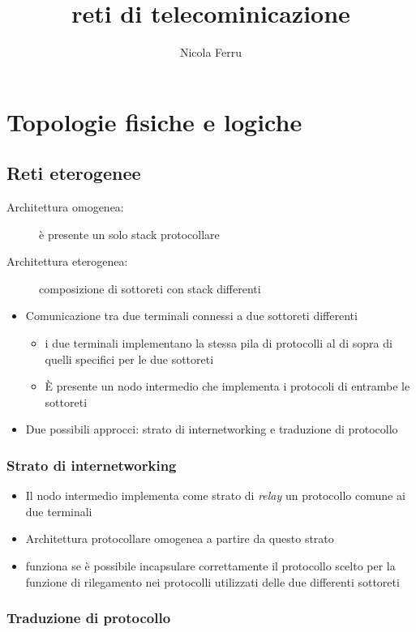 \documentclass{book}
\title{reti di telecominicazione}
\author{Nicola Ferru}
\theoremstyle{definition}
\begin{document}

\tableofcontents


\clearpage
\section{Topologie fisiche e logiche}
\label{sec:fiselogic}

\subsection{Reti eterogenee}
\label{sec:retiEterogenee}
\begin{description}
\item[Architettura omogenea:] è presente un solo stack protocollare
\item[Architettura eterogenea:] composizione di sottoreti con stack differenti
\end{description}
\begin{itemize}
\item Comunicazione tra due terminali connessi a due sottoreti differenti
  \begin{itemize}
  \item i due terminali implementano la stessa pila di protocolli al di sopra di quelli specifici per le
    due sottoreti
  \item È presente un nodo intermedio che implementa i protocoli di entrambe le sottoreti
  \end{itemize}
\item Due possibili approcci: strato di internetworking e traduzione di protocollo
\end{itemize}
\subsubsection{Strato di internetworking}
\label{sec:stratodiinter}
\begin{itemize}
\item Il nodo intermedio implementa come strato di \textit{relay} un protocollo comune ai due terminali
\item Architettura protocollare omogenea a partire da questo strato
\item funziona se è possibile incapsulare correttamente il protocollo scelto per la funzione di rilegamento
    nei protocolli utilizzati delle due differenti sottoreti
\end{itemize}

\subsubsection{Traduzione di protocollo}
\label{sec:tradiprot}
\end{document}
